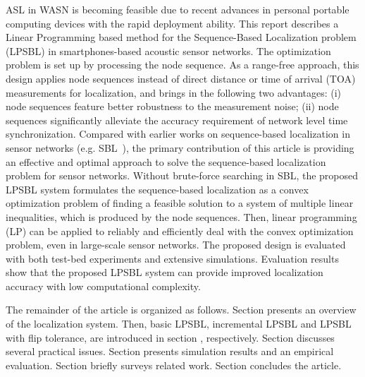 ASL in WASN is becoming feasible due to recent advances in personal portable computing devices with the rapid deployment ability.
This report describes a Linear Programming based method
for the Sequence-Based Localization problem (LPSBL)  in smartphones-based acoustic sensor networks.
The optimization problem is set up by processing the node sequence. 
As a range-free approach, this design applies node sequences instead of direct distance
or time of arrival (TOA) measurements for localization, and brings in the following two advantages: (i) node sequences feature better
robustness to the measurement noise; (ii) node sequences significantly alleviate the accuracy requirement of network level time synchronization. 
Compared with earlier works on sequence-based localization in sensor
networks (e.g. SBL~\cite{yedavalli2008sequence}), the primary contribution
of this article is providing an effective and optimal approach
to solve the sequence-based localization problem for sensor networks. 
Without brute-force searching in SBL, the proposed LPSBL system formulates the
sequence-based localization as a convex optimization problem
of finding a feasible solution to a system of multiple linear
inequalities, which is produced by the node sequences.
Then, linear programming (LP) can be applied to reliably and efficiently deal with the convex optimization problem,
even in large-scale sensor networks. 
The proposed design is evaluated with both test-bed experiments and extensive simulations. 
Evaluation results show that the proposed LPSBL system can provide improved localization accuracy with low computational complexity.


The remainder of the article is organized as follows. 
Section \uppercase\expandafter{} presents an overview of the  localization system.
Then, basic LPSBL, incremental LPSBL and LPSBL with flip tolerance, are introduced in section \uppercase\expandafter{}, respectively.
Section \uppercase\expandafter{} discusses several practical issues.
Section \uppercase\expandafter{} presents simulation results and an empirical evaluation. Section \uppercase\expandafter{} briefly surveys related work.
Section \uppercase\expandafter{} concludes the article.



